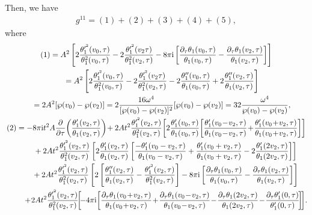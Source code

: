 \documentclass[10pt,a4paper]{amsart}
\numberwithin{equation}{section}
\begin{document}
Then, we have
\begin{gather*}
g^{11}=(1)+(2)+(3)+(4)+(5),
\end{gather*}
where
\begin{gather*}
(1)=A^2\left[ 2\frac{\theta_1^{\prime^2}(v_0,\tau)}{\theta_1^2(v_0,\tau)} -2\frac{\theta_1^{\prime^2}(v_2\tau)}{\theta_1^2(v_2,\tau)} -8\pi {\rm i}\left[\frac{\partial_{\tau}\theta_1(v_0,\tau)}{\theta_1(v_0,\tau)} -\frac{\partial_{\tau}\theta_1(v_2,\tau)}{\theta_1(v_2,\tau)}\right] \right]
\\ \hphantom{(1)}
=A^2\left[ 2\frac{\theta_1^{\prime^2}(v_0,\tau)}{\theta_1^2(v_0,\tau)} -2\frac{\theta_1^{\prime^2}(v_2\tau)}{\theta_1^2(v_2,\tau)} -2\frac{\theta_1^{\prime\prime}(v_0,\tau)}{\theta_1(v_0,\tau)} +2\frac{\theta_1^{\prime\prime}(v_2,\tau)}{\theta_1(v_2,\tau)}\right]
\\\hphantom{(1)}
=2A^2[\wp(v_0)-\wp(v_2)]=2\frac{16\omega^4}{[\wp(v_0)-\wp(v_2)]^2} [\wp(v_0)-\wp(v_2)]=32\frac{\omega^4}{\wp(v_0)-\wp(v_2)},
\\
(2)=-8\pi {\rm i}t^2A\frac{\partial}{\partial \tau}\! \left(\frac{\theta_1^{\prime}(v_2,\tau)}{\theta_1(v_2,\tau)}\right)
\!+2At^2\frac{\theta_1^{\prime^2}(v_2,\tau)}{\theta_1^2(v_2,\tau)} \!\left[2\frac{\theta_1^{\prime}(v_0,\tau)}{\theta_1(v_0,\tau)} \!\left[ \frac{\theta_1^{\prime}(v_0\!-\!v_2,\tau)}{\theta_1(v_0\!-\!v_2,\tau)} \! +\!\frac{\theta_1^{\prime}(v_0\!+\!v_2,\tau)}{\theta_1(v_0\!+\!v_2,\tau)}\right]\right]
\\ \hphantom{(2)=}
+2At^2\frac{\theta_1^{\prime^2}(v_2,\tau)}{\theta_1^2(v_2,\tau)} \left[2\frac{\theta_1^{\prime}(v_2,\tau)}{\theta_1(v_2,\tau)}\left[ \frac{-\theta_1^{\prime}(v_0-v_2,\tau)}{\theta_1(v_0-v_2,\tau)} +\frac{\theta_1^{\prime}(v_0+v_2,\tau)}{\theta_1(v_0+v_2,\tau)} -2\frac{\theta_1^{\prime}(2v_2,\tau)}{\theta_1(2v_2,\tau)}\right]\right]
\\ \hphantom{(2)=}
+2At^2\frac{\theta_1^{\prime^2}(v_2,\tau)}{\theta_1^2(v_2,\tau)} \left[2\left[\frac{\theta_1^{\prime\prime}(v_2,\tau)}{\theta_1(v_2,\tau)} -\frac{\theta_1^{\prime^2}(v_2,\tau)}{\theta_1^2(v_2,\tau)}\right]-8\pi {\rm i}\left[\frac{\partial_{\tau}\theta_1(v_0,\tau)}{\theta_1(v_0,\tau)} -\frac{\partial_{\tau}\theta_1(v_2,\tau)}{\theta_1(v_2,\tau)}\right]\right]
\\ \hphantom{(2)=}
+\!2At^2\frac{\theta_1^{\prime^2}(v_2,\tau)}{\theta_1^2(v_2,\tau)}\!\!\left[\!-4\pi {\rm i}\!\left[\frac{\partial_{\tau}\theta_1(v_0\!+\!v_2,\tau)}{\theta_1(v_0\!+\!v_2,\tau)} \!+\!\frac{\partial_{\tau}\theta_1(v_0\!-\!v_2,\tau)}{\theta_1(v_0\!-\!v_2,\tau)} \!-\!\frac{\partial_{\tau}\theta_1(2v_2,\tau)}{\theta_1(2v_2,\tau)} \!-\!\frac{\partial_{\tau}\theta_1^{\prime}(0,\tau)}{\theta_1^{\prime}(0,\tau)}\!\right]\! \right]\!.
\end{gather*}
\end{document}
